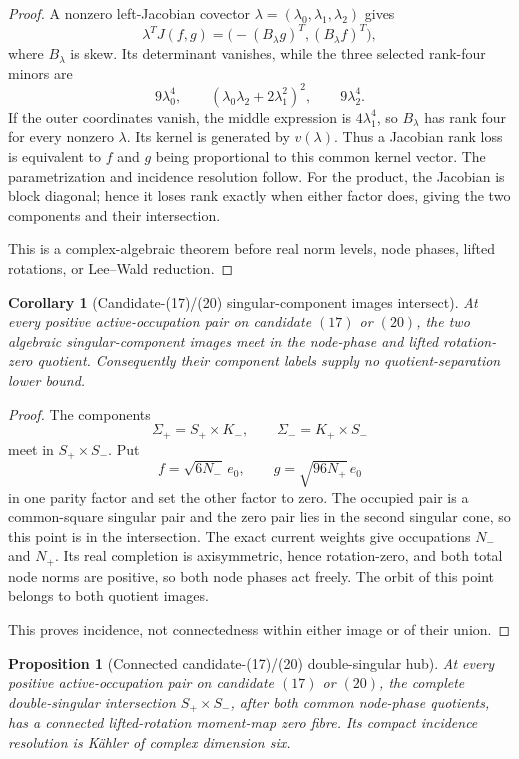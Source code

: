 \documentclass[11pt]{article}
\newtheorem{proposition}[theorem]{Proposition}
\newtheorem{corollary}[theorem]{Corollary}
\theoremstyle{definition}
\theoremstyle{remark}
\begin{document}
\begin{proof}
A nonzero left-Jacobian covector
\(\lambda=(\lambda_0,\lambda_1,\lambda_2)\) gives
\[
 \lambda^TJ(f,g)
 =\bigl(-(B_\lambda g)^T,(B_\lambda f)^T\bigr),
\]
where \(B_\lambda\) is skew.  Its determinant vanishes, while the three
selected rank-four minors are
\[
 9\lambda_0^4,\qquad
 (\lambda_0\lambda_2+2\lambda_1^2)^2,\qquad
 9\lambda_2^4.
\]
If the outer coordinates vanish, the middle expression is
\(4\lambda_1^4\), so \(B_\lambda\) has rank four for every nonzero
\(\lambda\).  Its kernel is generated by \(v(\lambda)\).  Thus a Jacobian
rank loss is equivalent to \(f\) and \(g\) being proportional to this common
kernel vector.  The parametrization and incidence resolution follow.
For the product, the Jacobian is block diagonal; hence it loses rank exactly
when either factor does, giving the two components and their intersection.

This is a complex-algebraic theorem before real norm levels, node phases,
lifted rotations, or Lee--Wald reduction.
\end{proof}

\begin{corollary}[Candidate-(17)/(20) singular-component images intersect]
\label{cor:candidate-17-20-singular-component-incidence}
At every positive active-occupation pair on candidate \((17)\) or \((20)\),
the two algebraic singular-component images meet in the node-phase and lifted
rotation-zero quotient.  Consequently their component labels supply no
quotient-separation lower bound.
\end{corollary}

\begin{proof}
The components
\[
 \Sigma_+=S_+\times K_-,\qquad
 \Sigma_-=K_+\times S_-
\]
meet in \(S_+\times S_-\).  Put
\[
 f=\sqrt{6N_-}\,e_0,\qquad
 g=\sqrt{96N_+}\,e_0
\]
in one parity factor and set the other factor to zero.  The occupied pair is
a common-square singular pair and the zero pair lies in the second singular
cone, so this point is in the intersection.  The exact current weights give
occupations \(N_-\) and \(N_+\).  Its real completion is axisymmetric, hence
rotation-zero, and both total node norms are positive, so both node phases
act freely.  The orbit of this point belongs to both quotient images.

This proves incidence, not connectedness within either image or of their
union.
\end{proof}

\begin{proposition}[Connected candidate-(17)/(20) double-singular hub]
\label{prop:candidate-17-20-double-singular-hub}
At every positive active-occupation pair on candidate \((17)\) or \((20)\),
the complete double-singular intersection \(S_+\times S_-\), after both
common node-phase quotients, has a connected lifted-rotation moment-map zero
fibre.  Its compact incidence resolution is Kähler of complex dimension six.
\end{proposition}
\end{document}
